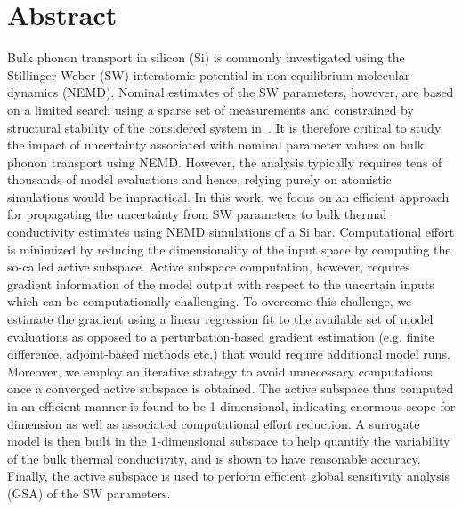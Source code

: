 \section*{Abstract}
Bulk phonon transport in silicon (Si) is commonly investigated using the
Stillinger-Weber (SW) interatomic potential in non-equilibrium molecular
dynamics (NEMD). Nominal estimates
of the SW parameters, however, are based on a limited search
using a sparse set of measurements and constrained by structural stability
of the considered system in~\cite{Stillinger:1985}. It is therefore
critical to study the impact of uncertainty associated with nominal
parameter values on bulk phonon transport using NEMD. 
However, the analysis typically requires tens of thousands of model evaluations
and hence, relying purely on atomistic simulations would be impractical.
In this work, we focus on an efficient approach for propagating the 
uncertainty from SW parameters
to bulk thermal conductivity estimates using NEMD simulations of a Si bar.
Computational effort is minimized by reducing the
dimensionality of the input space by computing the so-called active subspace.
Active subspace computation, however, requires gradient information of
the model output with respect to the uncertain inputs which can be
computationally challenging. To overcome this challenge, we estimate the
gradient using a linear regression fit to the available set of
model evaluations as opposed to a perturbation-based gradient estimation
(e.g. finite difference, adjoint-based methods etc.) 
that would require additional model runs. Moreover, 
we employ an iterative strategy to avoid unnecessary computations once
a converged active subspace is obtained.
The active subspace thus computed in an efficient manner is found to be
1-dimensional, indicating enormous scope for dimension as well as
associated computational effort reduction. A surrogate model is 
then built in the 1-dimensional subspace to help quantify
the variability of the bulk thermal conductivity, and is shown to have
reasonable accuracy. Finally, the
active subspace is used to perform efficient global sensitivity analysis (GSA)
of the SW parameters.  
